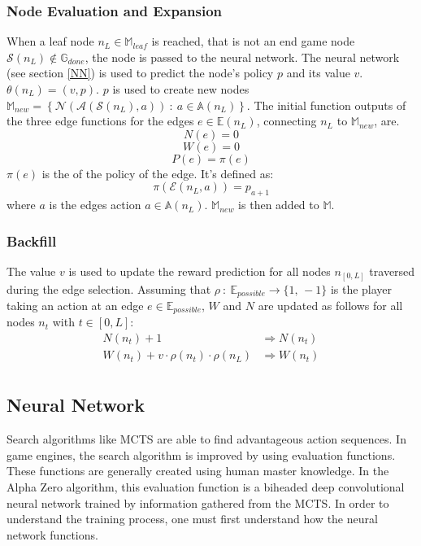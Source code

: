 \documentclass[12pt]{article}
\begin{document}
\subsubsection{Node Evaluation and Expansion}
When a leaf node \(n_L\in\mathbb{M}_{leaf}\) is reached, that is not an end game node \(\mathcal{S}(n_L)\not\in\mathbb{G}_{done}\), the node is passed to the neural network. The neural network (see section \ref{NN}) is used to predict the node's policy \(p\) and its value \(v\). \(\theta(n_L) = (v, p)\). \(p\) is used to create new nodes \(\mathbb{M}_{new} = \left\{\mathcal{N}(\mathcal{A}(\mathcal{S}(n_L), a))~:~a\in\mathbb{A}(n_L)\right\}\). The initial function outputs of the three edge functions for the edges \(e\in\mathbb{E}(n_L)\), connecting \(n_L\) to \(\mathbb{M}_{new}\), are.
\[
N(e) = 0
\]
\[
W(e) = 0
\]
\[
P(e) = \pi(e)
\]
\(\pi(e)\) is the of the policy of the edge. It's defined as:
\[
\pi(\mathcal{E}(n_L, a)) = p_{a+1}
\]
where \(a\) is the edges action \(a \in \mathbb{A}(n_L)\). \(\mathbb{M}_{new}\) is then added to \(\mathbb{M}\).

\subsubsection{Backfill}
The value \(v\) is used to update the reward prediction for all nodes \(n_{[0, L]}\) traversed during the edge selection. Assuming that \(\rho~:~\mathbb{E}_{possible}\to\{1,\,-1\}\) is the player taking an action at an edge \(e\in\mathbb{E}_{possible}\), \(W\) and \(N\) are updated as follows for all nodes \(n_t\) with \(t\in [0,L]\):
\begin{align*}
N(n_t) + 1 &\Rightarrow N(n_t)\\
W(n_t) + v \cdot \rho(n_t) \cdot \rho(n_L) &\Rightarrow W(n_t)\\
\end{align*}

\subsection{Neural Network}
Search algorithms like MCTS are able to find advantageous action sequences. In game engines, the search algorithm is improved by using evaluation functions. These functions are generally created using human master knowledge. In the Alpha Zero algorithm, this evaluation function is a biheaded deep convolutional neural network trained by information gathered from the MCTS. In order to understand the training process, one must first understand how the neural network functions.
\label{NN}
\end{document}
